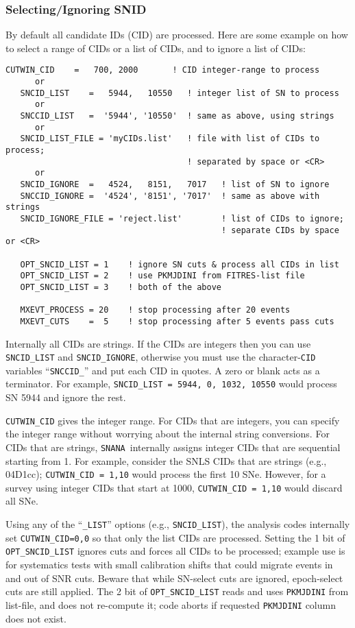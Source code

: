 \documentclass[12pt]{article}
\newcommand{\snana}{{\tt SNANA}}
\begin{document}
\subsubsection{Selecting/Ignoring SNID}
By default all candidate IDs (CID) are processed.
Here are some example on how to select a range
of CIDs or a list of CIDs, and to ignore
a list of CIDs:
%
\begin{Verbatim}[frame=single]
   CUTWIN_CID    =   700, 2000       ! CID integer-range to process
      or
   SNCID_LIST    =   5944,   10550   ! integer list of SN to process
      or
   SNCCID_LIST   =  '5944', '10550'  ! same as above, using strings
      or
   SNCID_LIST_FILE = 'myCIDs.list'   ! file with list of CIDs to process;
                                     ! separated by space or <CR>
      or
   SNCID_IGNORE  =   4524,   8151,   7017   ! list of SN to ignore
   SNCCID_IGNORE =  '4524', '8151', '7017'  ! same as above with strings
   SNCID_IGNORE_FILE = 'reject.list'        ! list of CIDs to ignore; 
                                            ! separate CIDs by space or <CR>

   OPT_SNCID_LIST = 1    ! ignore SN cuts & process all CIDs in list 
   OPT_SNCID_LIST = 2    ! use PKMJDINI from FITRES-list file
   OPT_SNCID_LIST = 3    ! both of the above

   MXEVT_PROCESS = 20    ! stop processing after 20 events
   MXEVT_CUTS    =  5    ! stop processing after 5 events pass cuts
\end{Verbatim}
%
Internally all CIDs are strings. If the CIDs are integers
then you can use {\tt SNCID\_LIST} and {\tt SNCID\_IGNORE},
otherwise you must use the character-{\tt CID} variables
``{\tt SNCCID\_}''  and put each CID in quotes. 
A zero or blank acts as a terminator. For example, 
{\tt SNCID\_LIST = 5944, 0, 1032, 10550}
would process SN 5944 and ignore the rest.

 
{\tt CUTWIN\_CID} gives the integer range.
For CIDs that are integers, you can specify the integer range
without worrying about the internal string conversions.
For CIDs that are strings, \snana\ internally assigns
integer CIDs that are sequential starting from 1. 
For example, consider the SNLS CIDs that are strings (e.g., 04D1cc);
{\tt CUTWIN\_CID = 1,10} would process the first 10 SNe.
However, for a survey using integer CIDs that start at 1000,
{\tt CUTWIN\_CID = 1,10} would discard all SNe.


Using any of the ``{\tt \_LIST}'' options (e.g., {\tt SNCID\_LIST}),
the analysis codes internally set {\tt CUTWIN\_CID=0,0}
so that only the list CIDs are processed.
Setting the 1 bit of {\tt OPT\_SNCID\_LIST} ignores cuts and
forces all CIDs to be processed; example use is for systematics
tests with small calibration shifts that could migrate events
in and out of SNR cuts. Beware that while SN-select cuts are ignored,
epoch-select cuts are still applied.
The 2 bit of {\tt OPT\_SNCID\_LIST} reads and uses {\tt PKMJDINI} 
from list-file, and does not re-compute it; code aborts if
requested {\tt PKMJDINI} column does not exist.
\end{document}
